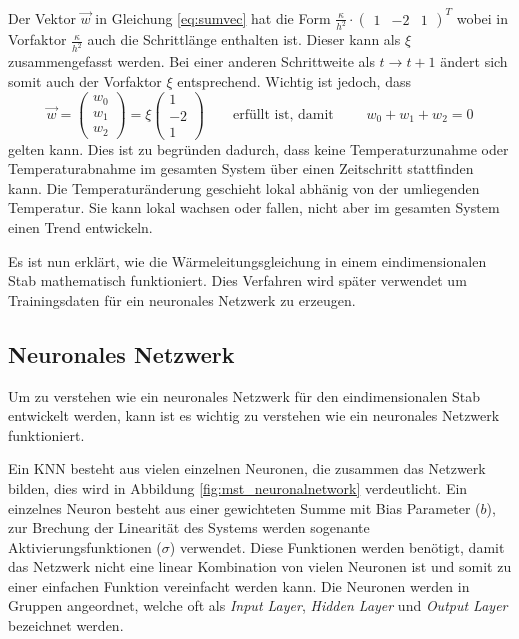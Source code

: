 Der Vektor $\vec{w}$ in Gleichung \eqref{eq:sumvec} hat die Form  $\frac{\kappa}{h^2} \cdot  \begin{pmatrix} 1 & -2 & 1 \end{pmatrix}^{T}$ wobei in Vorfaktor $\frac{\kappa}{h^2}$ auch die Schrittlänge enthalten ist. Dieser kann als $\xi$ zusammengefasst werden. Bei einer anderen Schrittweite als $t \rightarrow t+1$ ändert sich somit auch der Vorfaktor $\xi$ entsprechend. Wichtig ist jedoch, dass 
\begin{equation}
	\vec{w} = \begin{pmatrix} w_{0} \\ w_{1} \\ w_{2} \end{pmatrix} = \xi \begin{pmatrix} 1 \\ -2 \\ 1 \end{pmatrix}
	\qquad\text{erfüllt ist, damit }\qquad
	w_{0} + w_{1} + w_{2} = 0
\end{equation}
gelten kann. Dies ist zu begründen dadurch, dass keine Temperaturzunahme oder Temperaturabnahme im gesamten System über einen Zeitschritt stattfinden kann. Die Temperaturänderung geschieht lokal abhänig von der umliegenden Temperatur. Sie kann lokal wachsen oder fallen, nicht aber im gesamten System einen Trend entwickeln.

Es ist nun erklärt, wie die Wärmeleitungsgleichung in einem eindimensionalen Stab mathematisch funktioniert. Dies Verfahren wird später verwendet um Trainingsdaten für ein neuronales Netzwerk zu erzeugen.


\subsection{Neuronales Netzwerk}

Um zu verstehen wie ein neuronales Netzwerk für den eindimensionalen Stab entwickelt werden, kann ist es wichtig zu verstehen wie ein neuronales Netzwerk funktioniert.

Ein KNN besteht aus vielen einzelnen Neuronen, die zusammen das Netzwerk bilden, dies wird in Abbildung \ref{fig:mst_neuronalnetwork} verdeutlicht. Ein einzelnes Neuron besteht aus einer gewichteten Summe mit Bias Parameter ($b$), zur Brechung der Linearität des Systems werden sogenante Aktivierungsfunktionen ($\sigma$) verwendet. Diese Funktionen werden benötigt, damit das Netzwerk nicht eine linear Kombination von vielen Neuronen ist und somit zu einer einfachen Funktion vereinfacht werden kann. Die Neuronen werden in Gruppen angeordnet, welche oft als \textit{Input Layer}, \textit{Hidden Layer} und \textit{Output Layer} bezeichnet werden. 


